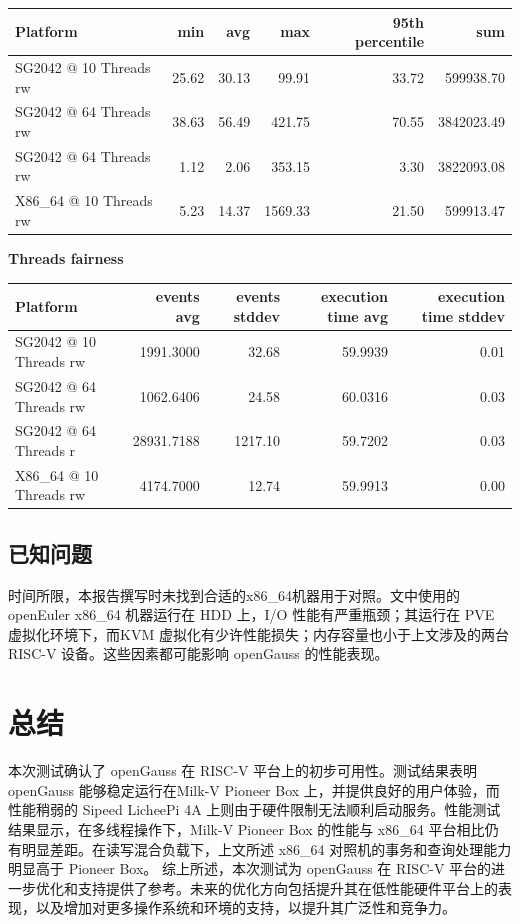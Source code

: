\documentclass{article}
\begin{document}
\begin{table}[h]
\centering
\begin{tabular}{|l|r|r|r|r|r|}
\hline
Platform & min & avg & max & 95th percentile & sum \\
\hline
SG2042 @ 10 Threads rw & 25.62 & 30.13 & 99.91 & 33.72 & 599938.70 \\
SG2042 @ 64 Threads rw & 38.63 & 56.49 & 421.75 & 70.55 & 3842023.49 \\
SG2042 @ 64 Threads rw & 1.12 & 2.06 & 353.15 & 3.30 & 3822093.08 \\
X86\_64 @ 10 Threads rw & 5.23 & 14.37 & 1569.33 & 21.50 & 599913.47 \\
\hline
\end{tabular}
\end{table}



\textbf{Threads fairness}

\begin{table}[h]
\centering
\begin{tabular}{|l|r|r|r|r|}
\hline
Platform & events avg & events stddev & execution time avg & execution time stddev \\
\hline
SG2042 @ 10 Threads rw & 1991.3000 & 32.68 & 59.9939 & 0.01 \\
SG2042 @ 64 Threads rw & 1062.6406 & 24.58 & 60.0316 & 0.03 \\
SG2042 @ 64 Threads r & 28931.7188 & 1217.10 & 59.7202 & 0.03 \\
X86\_64 @ 10 Threads rw & 4174.7000 & 12.74 & 59.9913 & 0.00 \\
\hline
\end{tabular}
\end{table}

\subsection{已知问题}

时间所限，本报告撰写时未找到合适的x86\_64机器用于对照。文中使用的 openEuler x86\_64 机器运行在 HDD 上，I/O 性能有严重瓶颈；其运行在 PVE 虚拟化环境下，而KVM 虚拟化有少许性能损失；内存容量也小于上文涉及的两台 RISC-V 设备。这些因素都可能影响 openGauss 的性能表现。

\section{总结}

本次测试确认了 openGauss 在 RISC-V 平台上的初步可用性。测试结果表明 openGauss 能够稳定运行在Milk-V Pioneer Box 上，并提供良好的用户体验，而性能稍弱的 Sipeed LicheePi 4A 上则由于硬件限制无法顺利启动服务。性能测试结果显示，在多线程操作下，Milk-V Pioneer Box 的性能与 x86\_64 平台相比仍有明显差距。在读写混合负载下，上文所述 x86\_64 对照机的事务和查询处理能力明显高于 Pioneer Box。
综上所述，本次测试为 openGauss 在 RISC-V 平台的进一步优化和支持提供了参考。未来的优化方向包括提升其在低性能硬件平台上的表现，以及增加对更多操作系统和环境的支持，以提升其广泛性和竞争力。
\end{document}
